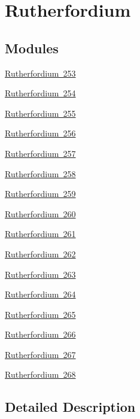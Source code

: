 \hypertarget{group___isotope_const-_rutherfordium}{}\section{Rutherfordium}
\label{group___isotope_const-_rutherfordium}
\subsection*{Modules}
\begin{DoxyCompactItemize}
\item 
\mbox{\hyperlink{group___isotope_const-_rutherfordium-_rf253}{Rutherfordium 253}}
\item 
\mbox{\hyperlink{group___isotope_const-_rutherfordium-_rf254}{Rutherfordium 254}}
\item 
\mbox{\hyperlink{group___isotope_const-_rutherfordium-_rf255}{Rutherfordium 255}}
\item 
\mbox{\hyperlink{group___isotope_const-_rutherfordium-_rf256}{Rutherfordium 256}}
\item 
\mbox{\hyperlink{group___isotope_const-_rutherfordium-_rf257}{Rutherfordium 257}}
\item 
\mbox{\hyperlink{group___isotope_const-_rutherfordium-_rf258}{Rutherfordium 258}}
\item 
\mbox{\hyperlink{group___isotope_const-_rutherfordium-_rf259}{Rutherfordium 259}}
\item 
\mbox{\hyperlink{group___isotope_const-_rutherfordium-_rf260}{Rutherfordium 260}}
\item 
\mbox{\hyperlink{group___isotope_const-_rutherfordium-_rf261}{Rutherfordium 261}}
\item 
\mbox{\hyperlink{group___isotope_const-_rutherfordium-_rf262}{Rutherfordium 262}}
\item 
\mbox{\hyperlink{group___isotope_const-_rutherfordium-_rf263}{Rutherfordium 263}}
\item 
\mbox{\hyperlink{group___isotope_const-_rutherfordium-_rf264}{Rutherfordium 264}}
\item 
\mbox{\hyperlink{group___isotope_const-_rutherfordium-_rf265}{Rutherfordium 265}}
\item 
\mbox{\hyperlink{group___isotope_const-_rutherfordium-_rf266}{Rutherfordium 266}}
\item 
\mbox{\hyperlink{group___isotope_const-_rutherfordium-_rf267}{Rutherfordium 267}}
\item 
\mbox{\hyperlink{group___isotope_const-_rutherfordium-_rf268}{Rutherfordium 268}}
\end{DoxyCompactItemize}


\subsection{Detailed Description}
